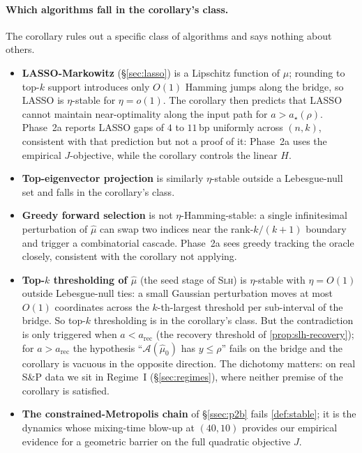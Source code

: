\paragraph{Which algorithms fall in the corollary's class.}
The corollary rules out a specific class of algorithms and says nothing about others.
\begin{itemize}\itemsep=2pt
\item \textbf{LASSO-Markowitz} (\S\ref{sec:lasso}) is a Lipschitz function of $\hat\mu$;
rounding to top-$k$ support introduces only $O(1)$ Hamming jumps along the bridge, so
LASSO is $\eta$-stable for $\eta = o(1)$. The corollary then predicts that LASSO cannot
maintain near-optimality along the input path for $a>a_\star(\rho)$. Phase~2a reports
LASSO gaps of $4$ to $11$\,bp uniformly across $(n,k)$, consistent with that prediction
but not a proof of it: Phase~2a uses the empirical $J$-objective, while the corollary
controls the linear $H$.

\item \textbf{Top-eigenvector projection} is similarly $\eta$-stable outside a
Lebesgue-null set and falls in the corollary's class.

\item \textbf{Greedy forward selection} is not $\eta$-Hamming-stable: a single
infinitesimal perturbation of $\hat\mu$ can swap two indices near the
rank-$k/(k{+}1)$ boundary and trigger a combinatorial cascade. Phase~2a sees greedy
tracking the oracle closely, consistent with the corollary not applying.

\item \textbf{Top-$k$ thresholding of $\hat\mu$} (the seed stage of \textsc{Slh}) is
$\eta$-stable with $\eta=O(1)$ outside Lebesgue-null ties: a small Gaussian perturbation
moves at most $O(1)$ coordinates across the $k$-th-largest threshold per sub-interval of
the bridge. So top-$k$ thresholding is in the corollary's class. But the
contradiction is only triggered when $a < a_{\mathrm{rec}}$ (the recovery threshold of
\cref{prop:slh-recovery}); for $a > a_{\mathrm{rec}}$ the hypothesis
``$\mathcal A(\hat\mu_0)$ has $y\le\rho$'' fails on the bridge and the corollary is
vacuous in the opposite direction. The dichotomy matters: on real S\&P data we sit in
Regime~I (\S\ref{sec:regimes}), where neither premise of the corollary is satisfied.

\item \textbf{The constrained-Metropolis chain} of \S\ref{ssec:p2b} fails
\cref{def:stable}; it is the dynamics whose mixing-time blow-up at $(40,10)$ provides
our empirical evidence for a geometric barrier on the full quadratic objective $J$.
\end{itemize}

